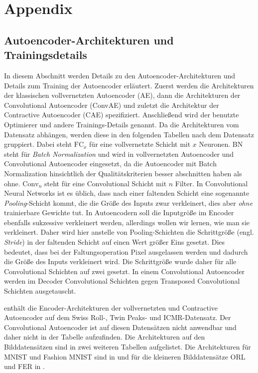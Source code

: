 
\chapter{Appendix}
\label{ch:Appendix}

\section{Autoencoder-Architekturen und Trainingsdetails}
\label{ch:Appendix:Architektur-Details}
In diesem Abschnitt werden Details zu den Autoencoder-Architekturen und Details zum Training der Autoencoder erläutert. Zuerst werden die Architekturen der klassischen vollvernetzten Autoencoder (AE), dann die Architekturen der Convolutional Autoencoder (ConvAE) und zuletzt die Architektur der Contractive Autoencoder (CAE) spezifiziert. Anschließend wird der benutzte Optimierer und andere Trainings-Details genannt. Da die Architekturen
vom Datensatz abhängen, werden diese in den folgenden Tabellen nach dem Datensatz gruppiert. Dabei steht $\text{FC}_{x}$ für eine vollvernetzte Schicht mit $x$ Neuronen. BN steht für \textit{Batch Normalization} \parencite{Ioffe.2015} und wird in vollvernetzten Autoencoder und Convolutional Autoencoder eingesetzt,
da die Autoencoder mit Batch Normalization hinsichtlich der Qualitätskriterien besser abschnitten
haben als ohne. $\text{Conv}_n$ steht für eine Convolutional Schicht mit $n$ Filter. In
Convolutional Neural Networks ist es üblich, dass nach einer faltenden Schicht eine sogenannte
\textit{Pooling}-Schicht \parencite[339 -- 345]{Goodfellow.2016} kommt, die die Größe des Inputs zwar verkleinert, dies aber
\textit{ohne} trainierbare Gewichte tut. In Autoencodern soll die Inputgröße im Encoder ebenfalls
sukzessive verkleinert werden, allerdings wollen wir lernen, wie man sie verkleinert. Daher wird
hier anstelle von Pooling-Schichten die Schrittgröße (engl. \textit{Stride}) in der faltenden
Schicht auf einen Wert größer Eins gesetzt. Dies bedeutet, dass bei der Faltungsoperation Pixel
ausgelassen werden und dadurch die Größe des Inputs verkleinert wird. Die Schrittgröße wurde daher
für alle Convolutional Schichten auf zwei gesetzt. In einem Convolutional Autoencoder werden im
Decoder Convolutional Schichten gegen Transposed Convolutional Schichten \parencite[siehe][]{Zeiler.2010} ausgetauscht.

 enthält die Encoder-Architekturen der vollvernetzten und Contractive Autoencoder auf dem Swiss Roll-, Twin Peaks- und ICMR-Datensatz.
Der Convolutional Autoencoder ist auf diesen Datensätzen nicht anwendbar und daher nicht in der Tabelle aufzufinden. Die Architekturen auf den Bilddatensätzen sind in zwei weiteren Tabellen aufgelistet. Die Architekturen für MNIST und Fashion MNIST sind in 
 und für die kleineren Bilddatensätze ORL und FER in .


